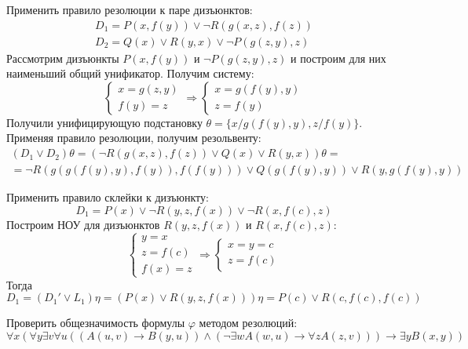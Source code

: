 \documentclass[11pt]{article}
\newcounter{th}\setcounter{th}{0}
\begin{document}
Применить правило резолюции к паре дизъюнктов:
\begin{gather*}
D_1 = P(x, f(y)) \lor \lnot R(g(x, z), f(z)) \\
D_2 = Q(x) \lor R(y, x) \lor \lnot P(g(z, y), z)
\end{gather*}
Рассмотрим дизъюнкты $P(x, f(y))$ и $\lnot P(g(z, y), z)$ и построим для них наименьший общий унификатор. Получим систему:
\begin{equation*}
\begin{cases}
x = g(z, y) \\
f(y) = z
\end{cases}
\Rightarrow \begin{cases}
x = g(f(y), y) \\
z = f(y)
\end{cases}
\end{equation*}
Получили унифицирующую подстановку $\theta = \{x/g(f(y), y), z/f(y)\}$. Применяя правило резолюции, получим резольвенту:
\begin{multline*}
(D_1 \lor D_2)\theta = (\lnot R(g(x, z), f(z)) \lor Q(x) \lor R(y, x))\theta = \\
= \lnot R(g(g(f(y), y), f(y)), f(f(y))) \lor Q(g(f(y), y)) \lor R(y, g(f(y), y))
\end{multline*}

Применить правило склейки к дизъюнкту:
\begin{equation*}
D_1 = P(x) \lor \lnot R(y, z, f(x)) \lor \lnot R(x, f(c), z)
\end{equation*}
Построим НОУ для дизъюнктов $R(y, z, f(x))$ и $R(x, f(c), z)$:
\begin{equation*}
\begin{cases}
y = x \\
z = f(c) \\
f(x) = z
\end{cases}
\Rightarrow
\begin{cases}
x = y = c \\
z = f(c)
\end{cases}
\end{equation*}
Тогда
\begin{equation*}
D_1 = (D_1' \lor L_1)\eta = (P(x) \lor R(y, z, f(x)))\eta = P(c) \lor R(c, f(c), f(c))
\end{equation*}

Проверить общезначимость формулы \(\varphi\) методом резолюций:
\begin{equation*}
\forall x (\forall y \exists v \forall u ((A(u, v) \to B(y, u)) \land (\lnot \exists w A(w, u) \to \forall z A(z, v))) \to \exists y B(x, y))
\end{equation*}
\end{document}
